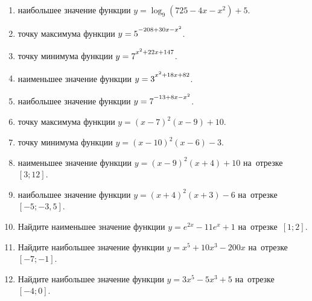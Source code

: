 \documentclass[a4paper,10pt]{article}
\begin{document}
\begin{enumerate}
\item {} наибольшее значение функции $y=\log_9\left(725-4x-x^2\right)+5$.

\item {} точку максимума функции $y=5\strut^{-208+30x-x^2}$.

\item {} точку минимума функции $y=7\strut^{x^2+22x+147}$.

\item {} наименьшее значение функции $y=3\strut^{x^2+18x+82}$.

\item {} наибольшее значение функции $y=7\strut^{-13+8x-x^2}$.

\item {} точку максимума функции $y=\left(x-7\right)^2\left(x-9\right)+10$.

\item {} точку минимума функции $y=\left(x-10\right)^2\left(x-6\right)-3$.

\item {} наименьшее значение функции $y=\left(x-9\right)^2\left(x+4\right)+10$ на~отрезке~$\left[3;12\right]$.

\item {} наибольшее значение функции $y=\left(x+4\right)^2\left(x+3\right)-6$ на~отрезке~$\left[-5;-3{,}5\right]$.

\item Найдите наименьшее значение функции $y=e^{2x}-11e^x+1$ на~отрезке~$\left[1;2\right]$.

\item Найдите наибольшее значение функции $y=x^5+10x^3-200x$ на~отрезке~$\left[-7;-1\right]$.

\item Найдите наибольшее значение функции $y=3x^5-5x^3+5$ на~отрезке~$\left[-4;0\right]$.

\end{enumerate}
\end{document}
